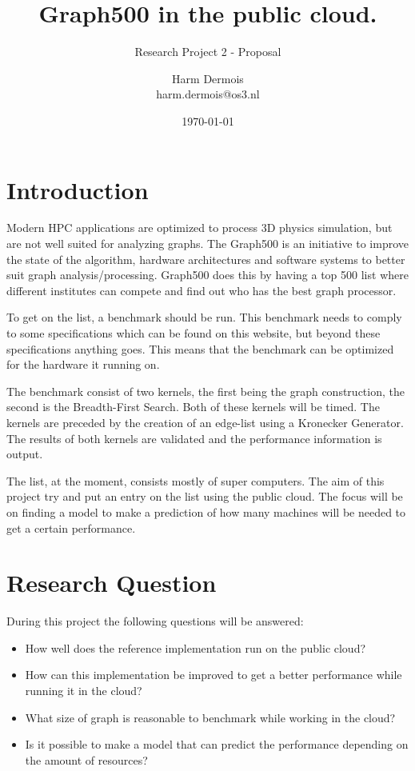 \documentclass[A4]{scrartcl}
\begin{document}
\title{Graph500 in the public cloud.}
\subtitle{Research Project 2 - Proposal}
\date{\today}
\author{Harm Dermois \\ harm.dermois@os3.nl}

\maketitle

\section*{Introduction}
\label{sec:introduction}
Modern HPC applications are optimized to process 3D physics simulation, but are not well suited for analyzing graphs. The Graph500 \cite{murphy2010introducing} is an initiative to improve the state of the algorithm, hardware architectures and software systems to better suit graph analysis/processing. Graph500 does this by having a top 500 list where different institutes can compete and find out who has the best graph processor.

To get on the list, a benchmark should be run. This benchmark needs to comply to some specifications which can be found on this website\cite{graph500-specs}, but beyond these specifications anything goes. This means that the benchmark can be optimized for the hardware it running on. 

The benchmark consist of two kernels, the first being the graph construction, the second is the Breadth-First Search. Both of these kernels will be timed. The kernels are preceded by the creation of an edge-list using a Kronecker Generator\cite{leskovec2010kronecker}. The results of both kernels are validated and the performance information is output. 

The list, at the moment, consists mostly of super computers. The aim  of this project try and put an entry on the list using the public cloud. The focus will be on finding a model to make a prediction of how many machines will be needed to get a certain performance.

\section*{Research Question}
During this project the following questions will be answered:
\begin{itemize}
\item How well does the reference implementation\cite{graph500-code} run on the public cloud?
\item How can this implementation be improved to get a better performance while running it in the cloud?
\item What size of graph is reasonable to benchmark while working in the cloud?
\item Is it possible to make a model that can predict the performance depending on the amount of resources?
\end{itemize}
\end{document}
